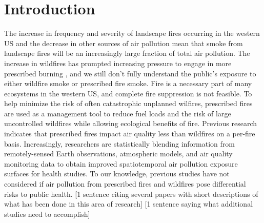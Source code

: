 \documentclass[authoryear]{elsarticle}
\begin{document}
\section{Introduction}
The increase in frequency and severity of landscape fires occurring in the western US \citep{Dennison2014,Steel2014} and the decrease in other sources of air pollution \citep{EPAPM25Trends2017} mean that smoke from landscape fires will be an increasingly large fraction of total air pollution.
The increase in wildfires has prompted increasing pressure to engage in more prescribed burning \citep{Stephens2005}, and we still don't fully understand the public's exposure to either wildfire smoke or prescribed fire smoke.
Fire is a necessary part of many ecosystems in the western US, and complete fire suppression is not feasible.
To help minimize the risk of often catastrophic unplanned wilfires, prescribed fires are used as a management tool to reduce fuel loads and the risk of large uncontrolled wildfires while allowing ecological benefits of fire.
Previous research indicates that prescribed fires impact air quality less than wildfires on a per-fire basis.
Increasingly, researchers are statistically blending information from remotely-sensed Earth observations, atmospheric models, and air quality monitoring data to obtain improved spatiotemporal air pollution exposure surfaces for health studies.
To our knowledge, previous studies have not considered if air pollution from prescribed fires and wildfires pose differential risks to public health.
[1 sentence citing several papers with short descriptions of what has been done in this area of research]
[1 sentence saying what additional studies need to accomplish]
\end{document}
